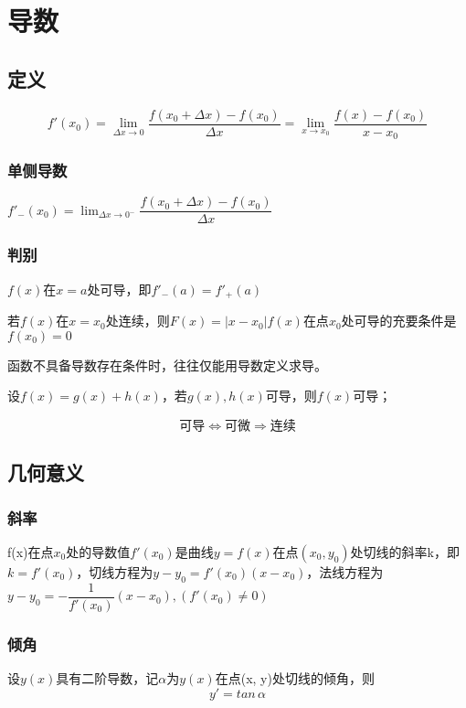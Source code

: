 
\chapter{导数}

\section{定义}
\[f'(x_0) = \lim_{\Delta x \to 0}\dfrac{f(x_0 + \Delta x) - f(x_0)}{\Delta x} = 
\lim_{x \to x_0}\dfrac{f(x) - f(x_0)}{x - x_0}\]

\subsection{单侧导数}
\(f'_-(x_0) = \displaystyle \lim_{\Delta x \to 0^-}\dfrac{f(x_0 + \Delta x) - f(x_0)}{\Delta x}\)

\subsection{判别}

\(f(x)\)在\(x = a\)处可导，即\(f'_-(a) = f'_+(a)\)

若\(f(x)\)在\(x = x_0\)处连续，则\(F(x) = |x - x_0|f(x)\)在点\(x_0\)处可导的充要条件是\(f(x_0) = 0\)

函数不具备导数存在条件时，往往仅能用导数定义求导。

设\(f(x) = g(x) + h(x)\)，若\(g(x), h(x)\)可导，则\(f(x)\)可导；

\[\text{可导} \Leftrightarrow \text{可微} \Rightarrow \text{连续}\]


\section{几何意义}

\subsection{斜率}
f(x)在点\(x_0\)处的导数值\(f'(x_0)\)是曲线\(y = f(x)\)在点\((x_0, y_0)\)处切线的斜率k，即\(k = f'(x_0)\)，切线方程为\(y - y_0 = f'(x_0)(x - x_0)\)，法线方程为\(y - y_0 = -\dfrac{1}{f'(x_0)}(x - x_0), (f'(x_0) \neq 0)\)

\subsection{倾角}
设\(y(x)\)具有二阶导数，记\(\alpha\)为\(y(x)\)在点(x, y)处切线的倾角，则\[y' = tan\,\alpha\]


